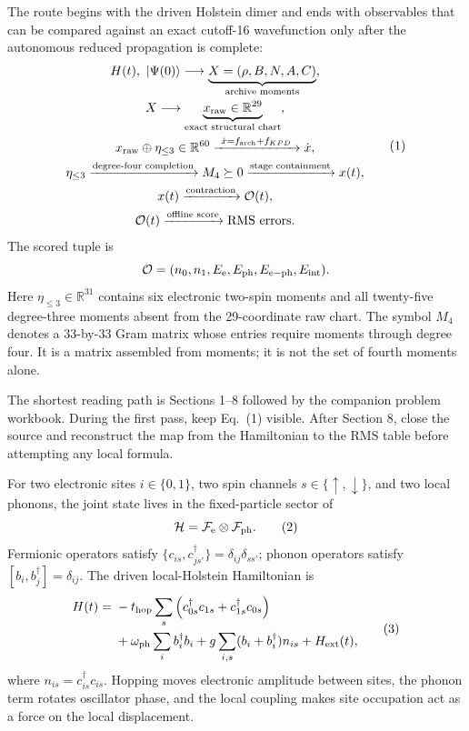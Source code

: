 \documentclass[10pt,letterpaper,twocolumn]{article}
\newcommand{\R}{\mathbb R}
\newcommand{\ket}[1]{\lvert #1\rangle}
\newcommand{\sectionline}[1]{%
  \Needspace{6\baselineskip}%
  \par\medskip{\color{navy}\large\bfseries #1}\par
  \vspace{-2pt}{\color{navy}\rule{\columnwidth}{0.7pt}}\par\smallskip
}
\begin{document}
The route begins with the driven Holstein dimer and ends with observables that
can be compared against an exact cutoff-16 wavefunction only after the
autonomous reduced propagation is complete:
\[
\begin{gathered}
H(t),\ \ket{\Psi(0)}
\longrightarrow
\underbrace{X=(\rho,B,N,A,C)}_{\text{archive moments}},\\
X\longrightarrow
\underbrace{x_{\rm raw}\in\R^{29}}_{\text{exact structural chart}},\\
x_{\rm raw}\oplus\eta_{\le3}\in\R^{60}
\xrightarrow{\ \dot x=f_{\rm arch}+f_{KPD}\ }
\dot x,\\
\eta_{\le3}
\xrightarrow{\text{degree-four completion}}
M_4\succeq0
\xrightarrow{\text{stage containment}}
x(t),\\
x(t)\xrightarrow{\text{contraction}}\mathcal O(t),\\
\mathcal O(t)\xrightarrow{\text{offline score}}\text{RMS errors}.
\end{gathered}
\tag{1}
\]
The scored tuple is
\[
\mathcal O=(n_0,n_1,E_{\rm e},E_{\rm ph},E_{\rm e-ph},E_{\rm int}).
\]
Here \(\eta_{\le3}\in\R^{31}\) contains six electronic two-spin moments and
all twenty-five degree-three moments absent from the 29-coordinate raw chart.
The symbol \(M_4\) denotes a 33-by-33 Gram matrix whose entries require moments
through degree four.  It is a matrix assembled from moments; it is not the set
of fourth moments alone.

The shortest reading path is Sections 1--8 followed by the companion problem
workbook.  During the first pass, keep Eq.~(1) visible.  After Section 8, close
the source and reconstruct the map from the Hamiltonian to the RMS table before
attempting any local formula.

\sectionline{1. The dimer before reduction}

For two electronic sites \(i\in\{0,1\}\), two spin channels
\(s\in\{\uparrow,\downarrow\}\), and two local phonons, the joint state lives
in the fixed-particle sector of
\[
\mathcal H=\mathcal F_{\rm e}\otimes\mathcal F_{\rm ph}.
\tag{2}
\]
Fermionic operators satisfy
\(\{c_{is},c_{js'}^\dagger\}=\delta_{ij}\delta_{ss'}\); phonon operators
satisfy \([b_i,b_j^\dagger]=\delta_{ij}\).  The driven local-Holstein
Hamiltonian is
\[
\begin{aligned}
H(t)={}&-t_{\rm hop}\sum_s
\left(c_{0s}^\dagger c_{1s}+c_{1s}^\dagger c_{0s}\right)\\
&+\omega_{\rm ph}\sum_i b_i^\dagger b_i
+g\sum_{i,s}(b_i+b_i^\dagger)n_{is}+H_{\rm ext}(t),
\end{aligned}
\tag{3}
\]
where \(n_{is}=c_{is}^\dagger c_{is}\).  Hopping moves electronic amplitude
between sites, the phonon term rotates oscillator phase, and the local coupling
makes site occupation act as a force on the local displacement.
\end{document}
